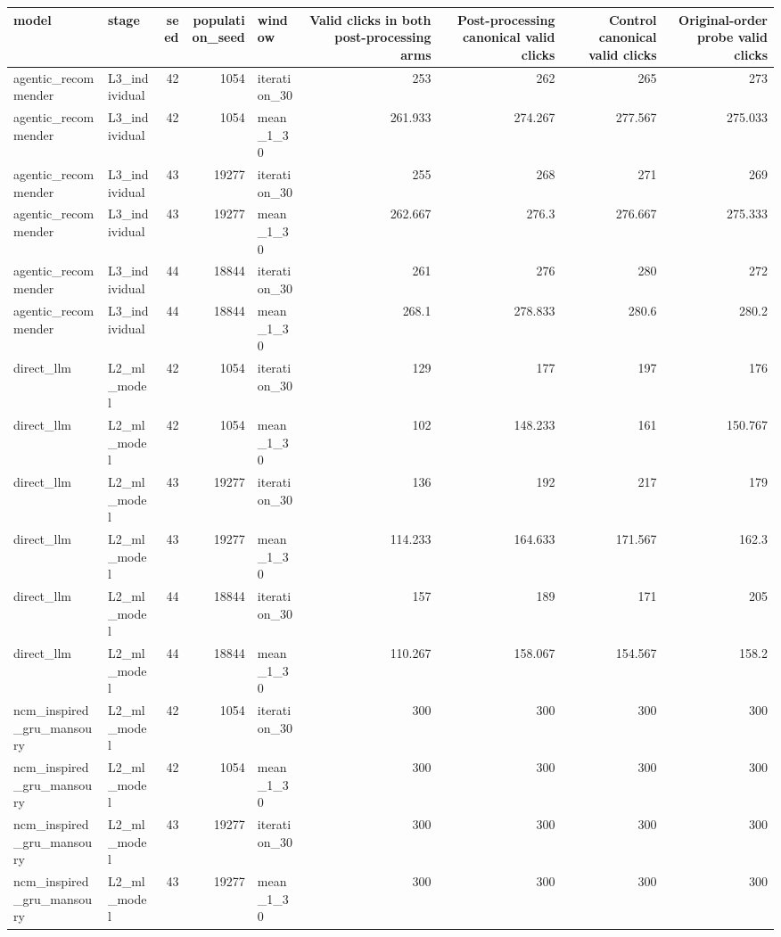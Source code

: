 \begin{table}[htbp!]
\centering
\small
\setlength{\tabcolsep}{3pt}
\renewcommand{\arraystretch}{1.1}
\begin{tabular}{llrrlrrrr}
\hline
model & stage & seed & population\_seed & window & Valid clicks in both post-processing arms & Post-processing canonical valid clicks & Control canonical valid clicks & Original-order probe valid clicks \\
\hline
agentic\_recommender & L3\_individual & 42 & 1054 & iteration\_30 & 253 & 262 & 265 & 273 \\
agentic\_recommender & L3\_individual & 42 & 1054 & mean\_1\_30 & 261.933 & 274.267 & 277.567 & 275.033 \\
agentic\_recommender & L3\_individual & 43 & 19277 & iteration\_30 & 255 & 268 & 271 & 269 \\
agentic\_recommender & L3\_individual & 43 & 19277 & mean\_1\_30 & 262.667 & 276.3 & 276.667 & 275.333 \\
agentic\_recommender & L3\_individual & 44 & 18844 & iteration\_30 & 261 & 276 & 280 & 272 \\
agentic\_recommender & L3\_individual & 44 & 18844 & mean\_1\_30 & 268.1 & 278.833 & 280.6 & 280.2 \\
direct\_llm & L2\_ml\_model & 42 & 1054 & iteration\_30 & 129 & 177 & 197 & 176 \\
direct\_llm & L2\_ml\_model & 42 & 1054 & mean\_1\_30 & 102 & 148.233 & 161 & 150.767 \\
direct\_llm & L2\_ml\_model & 43 & 19277 & iteration\_30 & 136 & 192 & 217 & 179 \\
direct\_llm & L2\_ml\_model & 43 & 19277 & mean\_1\_30 & 114.233 & 164.633 & 171.567 & 162.3 \\
direct\_llm & L2\_ml\_model & 44 & 18844 & iteration\_30 & 157 & 189 & 171 & 205 \\
direct\_llm & L2\_ml\_model & 44 & 18844 & mean\_1\_30 & 110.267 & 158.067 & 154.567 & 158.2 \\
ncm\_inspired\_gru\_mansoury & L2\_ml\_model & 42 & 1054 & iteration\_30 & 300 & 300 & 300 & 300 \\
ncm\_inspired\_gru\_mansoury & L2\_ml\_model & 42 & 1054 & mean\_1\_30 & 300 & 300 & 300 & 300 \\
ncm\_inspired\_gru\_mansoury & L2\_ml\_model & 43 & 19277 & iteration\_30 & 300 & 300 & 300 & 300 \\
ncm\_inspired\_gru\_mansoury & L2\_ml\_model & 43 & 19277 & mean\_1\_30 & 300 & 300 & 300 & 300 \\

\end{tabular}
\end{table}
